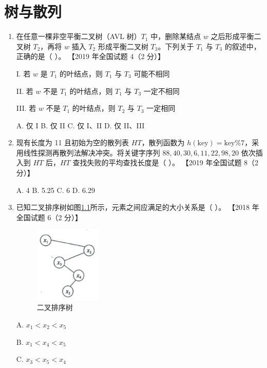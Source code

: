 \documentclass[lang=cn,newtx,10pt,scheme=chinese]{../../elegantbook}
\begin{document}
\chapter{树与散列}


\begin{enumerate}
    \item 在任意一棵非空平衡二叉树（AVL 树）$T_1$ 中，删除某结点 $w$ 之后形成平衡二叉树 $T_2$，再将 $w$ 插入 $T_2$ 形成平衡二叉树 $T_3$。下列关于 $T_1$ 与 $T_3$ 的叙述中，正确的是（ ）。  
    【2019 年全国试题 4（2 分）】  

    I. 若 $w$ 是 $T_1$ 的叶结点，则 $T_1$ 与 $T_3$ 可能不相同  

    II. 若 $w$ 不是 $T_1$ 的叶结点，则 $T_1$ 与 $T_3$ 一定不相同  

    III. 若 $w$ 不是 $T_1$ 的叶结点，则 $T_2$ 与 $T_3$ 一定相同  

    A. 仅 I \quad B. 仅 II \quad C. 仅 I、II \quad D. 仅 II、III  

    \item 现有长度为 11 且初始为空的散列表 $HT$，散列函数为 $h(\text{key}) = \text{key} \% 7$，采用线性探测再散列法解决冲突。将关键字序列 $88, 40, 30, 6, 11, 22, 98, 20$ 依次插入到 $HT$ 后，$HT$ 查找失败的平均查找长度是（ ）。  
    【2019 年全国试题 8（2 分）】  

    A. 4 \quad B. 5.25 \quad C. 6 \quad D. 6.29  

    \item 已知二叉排序树如图\ref{fig:9-3}所示，元素之间应满足的大小关系是（ ）。  
    【2018 年全国试题 6（2 分）】  

    \begin{figure}[h!]
        \centering
        \includegraphics[width=0.3\textwidth]{../../figure/exercisePicPDF/chapter9/9-3.pdf}
        \caption{二叉排序树}
        \label{fig:9-3}
    \end{figure}
    A. $x_1 < x_2 < x_5$ 

    B. $x_1 < x_4 < x_5$  

    C. $x_3 < x_5 < x_4$  


\end{enumerate}
\end{document}
